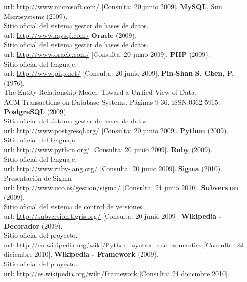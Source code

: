 \begin{thebibliography}{xx}
         url: \url{http://www.microsoft.com/}
         [Consulta: 20 junio 2009].
 \textbf{MySQL}, Sun Microsystems (2009).\\
         Sitio oficial del sistema gestor de bases de datos.\\
         url: \url{http://www.mysql.com/}
 \textbf{Oracle} (2009).\\
         Sitio oficial del sistema gestor de bases de datos.\\
         url: \url{http://www.oracle.com/}
         [Consulta: 20 junio 2009].
 \textbf{PHP} (2009).\\
         Sitio oficial del lenguaje.\\
         url: \url{http://www.php.net/}
         [Consulta: 20 junio 2009].
 \textbf{Pin-Shan S. Chen, P.} (1976).\\
         The Entity-Relationship Model: Toward a Unified View of Data. \\
         ACM Transactions on Database Systems. Páginas 9-36.
         ISSN:0362-5915.
 \textbf{PostgreSQL} (2009).\\
         Sitio oficial del sistema gestor de bases de datos.\\
         url: \url{http://www.postgresql.org/}
         [Consulta: 20 junio 2009].
 \textbf{Python} (2009).\\
         Sitio oficial del lenguaje.\\
         url: \url{http://www.python.org/}
         [Consulta: 20 junio 2009].
 \textbf{Ruby} (2009).\\
         Sitio oficial del lenguaje.\\
         url: \url{http://www.ruby-lang.org/}
         [Consulta: 20 junio 2009].
 \textbf{Sigma} (2010).\\
         Presentación de Sigma.\\
         url: \url{http://www.uco.es/gestion/sigma/}
         [Consulta: 24 junio 2010].
 \textbf{Subversion} (2009).\\
         Sitio oficial del sistema de control de versiones.\\
         url: \url{http://subversion.tigris.org/}
         [Consulta: 20 junio 2009].
 \textbf{Wikipedia - Decorador} (2009).\\
         Sitio oficial del proyecto.\\
         url: \url{http://en.wikipedia.org/wiki/Python_syntax_and_semantics}
         [Consulta: 24 diciembre 2010].
 \textbf{Wikipedia - Framework} (2009).\\
         Sitio oficial del proyecto.\\
         url: \url{http://es.wikipedia.org/wiki/Framework}
         [Consulta: 24 diciembre 2010].
 \end{thebibliography}